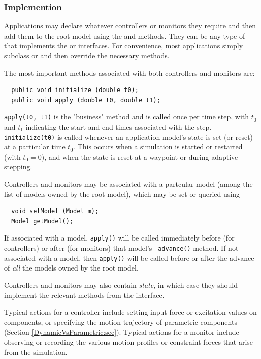 \subsubsection{Implemention}

Applications may declare whatever controllers or monitors they require
and then add them to the root model using the
 and
methods. They can be any type of
 that implements
the  or
 interfaces.  For
convenience, most applications simply subclass
 or
 and then override
the necessary methods.

The most important methods associated with both controllers and
monitors are:
%
\begin{lstlisting}
  public void initialize (double t0);
  public void apply (double t0, double t1);
\end{lstlisting}
%
{\tt apply(t0, t1)} is the "business" method and is called once per
time step, with $t_0$ and $t_1$ indicating the start and end times
associated with the step.  {\tt initialize(t0)} is called whenever an
application model's state is set (or reset) at a particular time
$t_0$. This occurs when a simulation is started or restarted (with
$t_0 = 0$), and when the state is reset at a waypoint or during
adaptive stepping.

Controllers and monitors may be associated with a partcular model
(among the list of models owned by the root model),
which may be set or queried using
%
\begin{lstlisting}
  void setModel (Model m);
  Model getModel();
\end{lstlisting}
%
If associated with a model, {\tt apply()} will be called immediately
before (for controllers) or after (for monitors) that model's {\tt
advance()} method. If not associated with a model, then {\tt apply()}
will be called before or after the advance of {\it all} the models
owned by the root model.

Controllers and monitors may also contain {\it state}, in which case
they should implement the relevant methods from the
 interface.

Typical actions for a controller include setting input force or
excitation values on components, or specifying the motion trajectory
of parametric components (Section \ref{DynamicVsParametric:sec}).
Typical actions for a monitor include observing or recording
the various motion profiles or constraint forces that arise
from the simulation.

